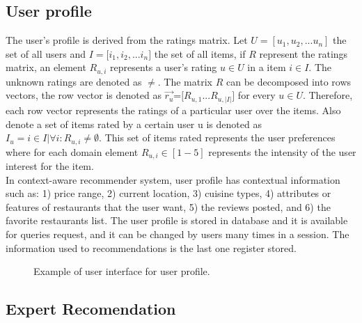 \subsection{User profile} \label{sec:3.2}  

The user's profile is derived from the ratings matrix. Let $U=[u_1,u_2,...u_n]$
the set of all users and $ I=[i_1,i_2,$...$i_n] $ the set of all items, if $R$
represent the ratings matrix,  an element  $R_{u,i}$ represents a user’s rating
$u \in U$  in a item $i \in I$.  The unknown ratings are denoted as $\neq $. The
matrix $R$ can be decomposed into rows vectors, the row vector is denoted as $
\overrightarrow{r_u} $=$[R_{u,1}$...$R_{u,|I|}]$ for every $u \in U$. Therefore,
each row vector represents the ratings of a particular user over the items. Also
denote a set of items rated by a certain user u is denoted as $ I_u = i \in I |
\forall  i: R_{u,i} \neq \emptyset $. This set of items rated represents the
user preferences where for each domain element $R_{u,i} \in [1-5]$ represents
the intensity of the user interest for  the item.\\  In context-aware
recommender system, user profile has contextual information such as: 1) price
range, 2) current location, 3) cuisine types, 4) attributes or features of
restaurants that the user want, 5) the reviews posted, and 6) the favorite
restaurants list. The user profile is stored in database and it is available for
queries request, and it can be changed by users many times in a session. The
information used to recommendations is the last one register stored.

\begin{figure*}
\captionsetup{justification=centering,margin=2cm}
\centering
\setlength\fboxsep{0pt}
\setlength\fboxrule{0.7pt}
\caption{Example of user interface for user profile.}
\label{fig:user-profile}       
\end{figure*}

\subsection{Expert Recomendation} \label{sec:3.3} 

